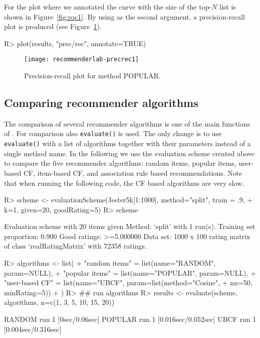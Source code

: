 \documentclass[nojss]{jss}
\newcommand{\func}[1]{\mbox{\texttt{#1()}}}
\begin{document}
For the plot where we annotated the curve with the size of the top-$N$ list
is shown in Figure~\ref{fig:roc1}.
By using  as the second argument, a precision-recall plot
is produced (see Figure~\ref{fig:precrec1}).

\begin{Schunk}
\begin{Sinput}
R> plot(results, "prec/rec", annotate=TRUE)
\end{Sinput}
\end{Schunk}
\begin{figure}
\centerline{\texttt{[image: recommenderlab-precrec1]}}
\caption{Precision-recall plot for method POPULAR.}
\label{fig:precrec1}
\end{figure}

\subsection{Comparing recommender algorithms}

The comparison of
several recommender algorithms is one of the main functions of
. For comparison also \func{evaluate} is used.
The only change is to use \func{evaluate} with
a list of algorithms together with their parameters instead of
a single method name. In the following we use the
evaluation scheme created above to compare the five
recommender algorithms: random items, popular items,
user-based CF, item-based CF, and association rule based recommendations.
Note that when running the following code, the CF based algorithms
are very slow.



\begin{Schunk}
\begin{Sinput}
R> scheme <- evaluationScheme(Jester5k[1:1000], method="split", train = .9,
+     k=1, given=20, goodRating=5)
R> scheme
\end{Sinput}
\begin{Soutput}
Evaluation scheme with 20 items given
Method: ‘split’ with 1 run(s).
Training set proportion: 0.900
Good ratings: >=5.000000
Data set: 1000 x 100 rating matrix of class ‘realRatingMatrix’ with 72358 ratings.
\end{Soutput}
\begin{Sinput}
R> algorithms <- list(
+         "random items" = list(name="RANDOM", param=NULL),
+         "popular items" = list(name="POPULAR", param=NULL),
+         "user-based CF" = list(name="UBCF", param=list(method="Cosine",
+ 		nn=50, minRating=5))
+         )
R> ## run algorithms
R> results <- evaluate(scheme, algorithms, n=c(1, 3, 5, 10, 15, 20))
\end{Sinput}
\begin{Soutput}
RANDOM run
	 1  [0sec/0.06sec]
POPULAR run
	 1  [0.016sec/0.052sec]
UBCF run
	 1  [0.004sec/0.316sec]
\end{Soutput}
\end{Schunk}
\end{document}
